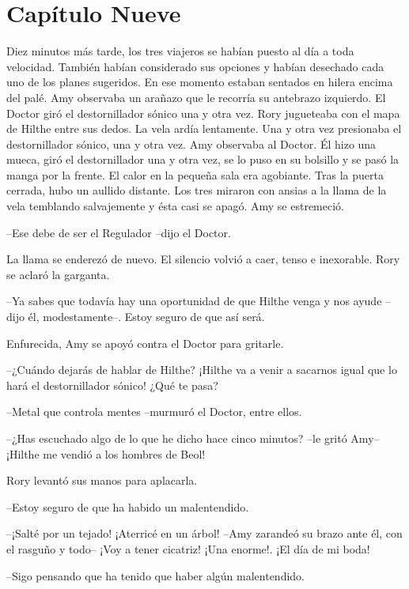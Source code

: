 \chapter*{Capítulo Nueve}

{Diez minutos más tarde, los tres viajeros se habían puesto al día a
	toda velocidad. También habían considerado sus opciones y habían
	desechado cada uno de los planes sugeridos. En ese momento estaban
	sentados en hilera encima del palé. Amy observaba un arañazo que le
	recorría su antebrazo izquierdo. El Doctor giró el destornillador sónico
	una y otra vez. Rory jugueteaba con el mapa de Hilthe entre sus dedos.
	La vela ardía lentamente. Una y otra vez presionaba el destornillador
	sónico, una y otra vez. Amy observaba al Doctor. Él hizo una mueca, giró
	el destornillador una y otra vez, se lo puso en su bolsillo y se pasó la
	manga por la frente. El calor en la pequeña sala era agobiante. Tras la
	puerta cerrada, hubo un aullido distante. Los tres miraron con ansias a
	la llama de la vela temblando salvajemente y ésta casi se apagó. Amy se
estremeció.}

{--Ese debe de ser el Regulador --dijo el Doctor.}

{La llama se enderezó de nuevo. El silencio volvió a caer, tenso e
inexorable. Rory se aclaró la garganta.}

{--Ya sabes que todavía hay una oportunidad de que Hilthe venga y nos
ayude --dijo él, modestamente--. Estoy seguro de que así será.}

{Enfurecida, Amy se apoyó contra el Doctor para gritarle.}

{--¿Cuándo dejarás de hablar de Hilthe? ¡Hilthe va a venir a sacarnos
igual que lo hará el destornillador sónico! ¿Qué te pasa?}

{--Metal que controla mentes --murmuró el Doctor, entre ellos.}

{--¿Has escuchado algo de lo que he dicho hace cinco minutos? --le
gritó Amy-- ¡Hilthe me vendió a los hombres de Beol!}

{Rory levantó sus manos para aplacarla.}

{--Estoy seguro de que ha habido un malentendido.}

{--¡Salté por un tejado! ¡Aterricé en un árbol! --Amy zarandeó su
	brazo ante él, con el rasguño y todo-- ¡Voy a tener cicatriz! ¡Una
enorme!. ¡El día de mi boda!}

{--Sigo pensando que ha tenido que haber algún malentendido.}

